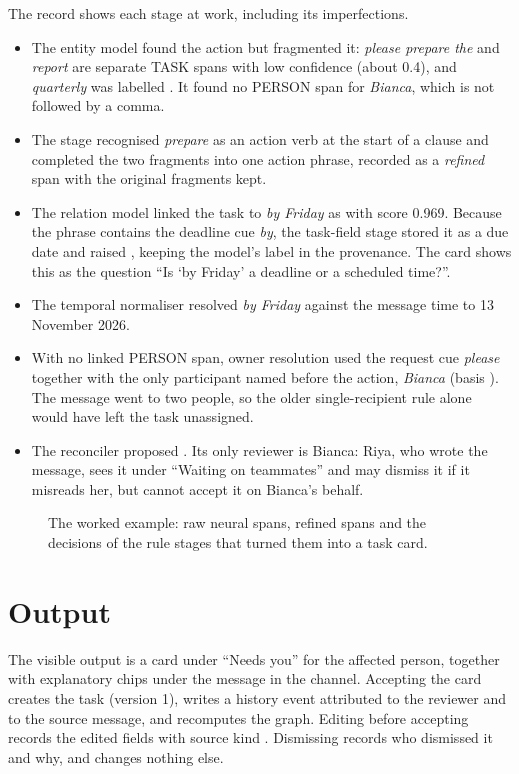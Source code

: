 The record shows each stage at work, including its imperfections.
\begin{itemize}
  \item The entity model found the action but fragmented it: \emph{please prepare the} and \emph{report} are separate TASK spans with low confidence (about 0.4), and \emph{quarterly} was labelled . It found no PERSON span for \emph{Bianca}, which is not followed by a comma.
  \item The  stage recognised \emph{prepare} as an action verb at the start of a clause and completed the two fragments into one action phrase, recorded as a \emph{refined} span with the original fragments kept.
  \item The relation model linked the task to \emph{by Friday} as  with score 0.969. Because the phrase contains the deadline cue \emph{by}, the task-field stage stored it as a due date and raised , keeping the model's label in the provenance. The card shows this as the question ``Is `by Friday' a deadline or a scheduled time?''.
  \item The temporal normaliser resolved \emph{by Friday} against the message time to 13 November 2026.
  \item With no linked PERSON span, owner resolution used the request cue \emph{please} together with the only participant named before the action, \emph{Bianca} (basis ). The message went to two people, so the older single-recipient rule alone would have left the task unassigned.
  \item The reconciler proposed . Its only reviewer is Bianca: Riya, who wrote the message, sees it under ``Waiting on teammates'' and may dismiss it if it misreads her, but cannot accept it on Bianca's behalf.
\end{itemize}

\begin{figure}[t]
\centering
{}
\caption[Raw neural and refined output for one live message]{The worked example: raw neural spans, refined spans and the decisions of the rule stages that turned them into a task card.}
\label{fig:exlive}
\end{figure}

\section{Output}
The visible output is a card under ``Needs you'' for the affected person, together with explanatory chips under the message in the channel. Accepting the card creates the task (version 1), writes a  history event attributed to the reviewer and to the source message, and recomputes the graph. Editing before accepting records the edited fields with source kind . Dismissing records who dismissed it and why, and changes nothing else.
